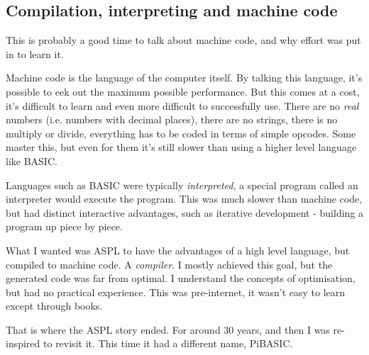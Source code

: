 \documentclass[10pt]{book}
\begin{document}
\subsection{Compilation, interpreting and machine code}
\par{This is probably a good time to talk about machine code, and why effort was put in to learn it.}
\par{Machine code is the language of the computer itself. By talking this language, it's possible to eek out the maximum possible performance. But this comes at a cost, it's difficult to learn and even more difficult to successfully use. There are no \emph{real} numbers (i.e. numbers with decimal places), there are no strings, there is no multiply or divide, everything has to be coded in terms of simple opcodes. Some master this, but even for them it's still slower than using a higher level language like BASIC.}
\par{Languages such as BASIC were typically \emph{interpreted}, a special program called an interpreter would execute the program. This was much slower than machine code, but had distinct interactive advantages, such as iterative development - building a program up piece by piece.}
\par{What I wanted was ASPL to have the advantages of a high level language, but compiled to machine code. A \emph{compiler}. I mostly achieved this goal, but the generated code was far from optimal. I understand the concepts of optimisation, but had no practical experience. This was pre-internet, it wasn't easy to learn except through books.}
\par{That is where the ASPL story ended. For around 30 years, and then I was re-inspired to revisit it. This time it had a different name, PiBASIC.}
\end{document}
